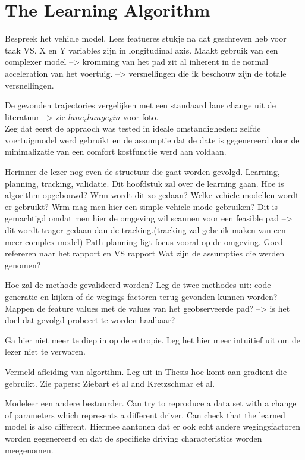 \chapter{The Learning Algorithm\\}
\label{cha:Learning_algorithm}

Bespreek het vehicle model. Lees featueres stukje na dat geschreven heb voor taak VS. X en Y variables zijn in longitudinal axis. Maakt gebruik van een complexer model --> kromming van het pad zit al inherent in de normal acceleration van het voertuig. --> versnellingen die ik beschouw zijn de totale versnellingen. 


De gevonden trajectories vergelijken met een standaard lane change uit de literatuur --> zie $lane_change_kin$ voor foto. \\

Zeg dat eerst de appraoch was tested in ideale omstandigheden: zelfde voertuigmodel werd gebruikt en de assumptie dat de date is gegenereerd door de minimalizatie van een comfort kostfunctie werd aan voldaan. 


Herinner de lezer nog even de structuur die gaat worden gevolgd. 
Learning, planning, tracking, validatie.
Dit hoofdstuk zal over de learning gaan.
Hoe is algorithm opgebouwd? Wrm wordt dit zo gedaan?
Welke vehicle modellen wordt er gebruikt? Wrm mag men hier een simple vehicle mode gebruiken?
Dit is gemachtigd omdat men hier de omgeving wil scannen voor een feasible pad --> dit wordt trager gedaan dan de tracking.(tracking zal gebruik maken van een meer complex model) Path planning ligt focus vooral op de omgeving.
Goed refereren naar het rapport en VS rapport
Wat zijn de assumpties die werden genomen?

Hoe zal de methode gevalideerd worden? Leg de twee methodes uit: code generatie en kijken of de wegings factoren terug gevonden kunnen worden? Mappen de feature values met de values van het geobserveerde pad? --> is het doel dat gevolgd probeert te worden haalbaar? 

Ga hier niet meer te diep in op de entropie. Leg het hier meer intuitief uit om de lezer niet te verwaren. 

Vermeld afleiding van algortihm. Leg uit in Thesis hoe komt aan gradient die gebruikt. Zie papers: Ziebart et al and Kretzschmar et al.

Modeleer een andere bestuurder. Can try to reproduce a data set with a change of parameters which represents a different driver. Can check that the learned model is also different. Hiermee aantonen dat er ook echt andere wegingsfactoren worden gegenereerd en dat de specifieke driving characteristics worden meegenomen.

